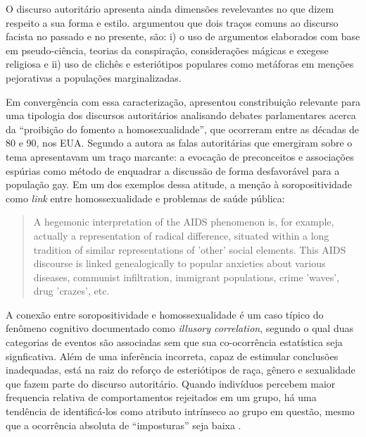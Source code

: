 \documentclass[
12pt,				%
openright,			%
twoside,			%
a4paper,			%
english,			%
french,				%
spanish,			%
brazil				%
]{abntex2}
\begin{document}
O discurso autoritário apresenta ainda dimensões revelevantes no que dizem respeito a sua forma e estilo.  argumentou que dois traços comuns ao discurso facista no passado e no presente, são: i) o uso de argumentos elaborados com base em pseudo-ciência, teorias da conspiração, considerações mágicas e exegese religiosa e ii) uso de clichês e esteriótipos populares como metáforas em menções pejorativas a populações marginalizadas.

Em convergência com essa caracterização,  apresentou constribuição relevante para uma tipologia dos discursos autoritários analisando debates parlamentares acerca da ``proibição do fomento a homosexualidade'', que ocorreram entre as décadas de 80 e 90, nos EUA. Segundo a autora as falas autoritárias que emergiram sobre o tema apresentavam um traço marcante: a evocação de preconceitos e associações espúrias como método de enquadrar a discussão de forma desfavorável para a população gay. Em um dos exemplos dessa atitude, a menção à soropositividade como \emph{link} entre homossexualidade e problemas de saúde pública:

\begin{samepage}
	\begin{quote}
		A hegemonic interpretation of the AIDS phenomenon is, for example, actually a representation of radical difference, situated within a long tradition of similar representations of 'other' social elements. This AIDS discourse is linked genealogically to popular anxieties about various diseases, communist infiltration, immigrant populations, crime 'waves', drug 'crazes', etc. \cite{smith2015advances}
	\end{quote}
\end{samepage}

A conexão entre soropositividade e homossexualidade é um caso típico do fenômeno cognitivo documentado como \emph{illusory correlation}, segundo o qual duas categorias de eventos são associadas sem que sua co-ocorrência estatística seja signficativa. Além de uma inferência incorreta, capaz de estimular conclusões inadequadas, está na raiz do reforço de esteriótipos de raça, gênero e sexualidade que fazem parte do discurso autoritário. Quando indivíduos percebem maior frequencia relativa de comportamentos rejeitados em um grupo, há uma tendência de identificá-los como atributo intrínseco ao grupo em questão, mesmo que a ocorrência absoluta de ``imposturas'' seja baixa \cite{sidanius2001social}.   
\end{document}
